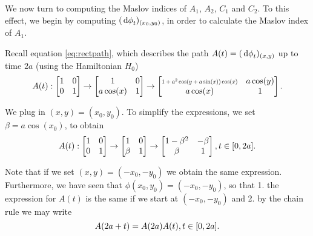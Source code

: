 We now turn to computing the Maslov indices of $A_1$, $A_2$, $C_1$ and $C_2$. To this effect, we begin by computing $(\dl \phi_t)_{(x_0,y_0)}$, in order to calculate the Maslov index of $A_1$.

Recall equation \eqref{eq:rectpath}, which describes the path $A(t) = (\dl \phi_t)_{(x,y)}$ up to time $2a$ (using the Hamiltonian $H_0$)
\begin{equation}\label{eq:rectpath2}
A(t) :
\begin{bmatrix}
1 & 0\\
0 & 1
\end{bmatrix}
\to
\begin{bmatrix}
1 & 0\\
a \cos(x) & 1
\end{bmatrix}
\to
\begin{bmatrix}
\scalebox{0.7}{$1+ a^2 \cos(y+a \sin(x)) \cos(x)$} &  a \cos(y)\\
a \cos(x) & 1
\end{bmatrix}.
\end{equation}

We plug in $(x,y) = (x_0, y_0)$. To simplify the expressions, we set $\beta = a \cos(x_0)$, to obtain
\begin{equation}
A(t) :
\begin{bmatrix}
1 & 0\\
0 & 1
\end{bmatrix}
\to
\begin{bmatrix}
1 & 0\\
\beta & 1
\end{bmatrix}
\to
\begin{bmatrix}
1 - \beta^2 &  -\beta \\
\beta & 1
\end{bmatrix}, t \in \interval 0 {2a}.
\end{equation}

Note that if we set $(x,y) = (-x_0, -y_0)$ we obtain the same expression. Furthermore, we have seen that $\phi(x_0, y_0) = (-x_0, -y_0)$, so that 1. the expression for $A(t)$ is the same if we start at $(-x_0, -y_0)$ and 2. by the chain rule we may write
\begin{equation}
A(2a + t) = A(2a) A(t), t \in \interval 0 {2a}.
\end{equation}

